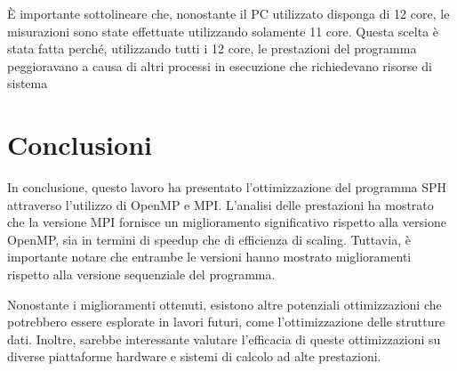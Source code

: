 \documentclass[a4paper,12pt, oneside]{article}
\begin{document}
È importante sottolineare che, nonostante il PC utilizzato disponga di 12 core, le
misurazioni sono state effettuate utilizzando solamente 11 core. Questa scelta è stata
fatta perché, utilizzando tutti i 12 core, le prestazioni del programma peggioravano a
causa di altri processi in esecuzione che richiedevano risorse di sistema

\section{Conclusioni}

In conclusione, questo lavoro ha presentato l'ottimizzazione del programma SPH attraverso
l'utilizzo di OpenMP e MPI. L'analisi delle prestazioni ha mostrato che la versione MPI
fornisce un miglioramento significativo rispetto alla versione OpenMP, sia in termini di
speedup che di efficienza di scaling. Tuttavia, è importante notare che entrambe le
versioni hanno mostrato miglioramenti rispetto alla versione sequenziale del programma.

Nonostante i miglioramenti ottenuti, esistono altre potenziali ottimizzazioni che potrebbero
essere esplorate in lavori futuri, come l'ottimizzazione delle strutture dati. Inoltre,
sarebbe interessante valutare l'efficacia di queste ottimizzazioni su diverse piattaforme
hardware e sistemi di calcolo ad alte prestazioni.
\end{document}
